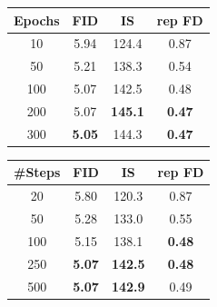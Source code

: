 \documentclass[10pt]{article}
\begin{document}
{\begin{minipage}[t]{.24\linewidth}\centering\fontsize{8}{9.1}\selectfont\begin{tabular}{cccc}
Epochs & FID & IS & rep FD \\
\midrule
10 & 5.94 & 124.4 & 0.87 \\
50 & 5.21 & 138.3 & 0.54 \\
100 & \cellcolor{grayband}5.07 & \cellcolor{grayband}142.5 & \cellcolor{grayband}0.48 \\
200 & 5.07 & \textbf{145.1} & \textbf{0.47} \\
300 & \textbf{5.05} & 144.3 & \textbf{0.47} \\
\end{tabular}\par{}\end{minipage}\hspace{1.5mm}%
\begin{minipage}[t]{.24\linewidth}\centering\fontsize{8}{9.1}\selectfont\begin{tabular}{cccc}
\#Steps & FID & IS & rep FD \\
\midrule
20 & 5.80 & 120.3 & 0.87 \\
50 & 5.28 & 133.0 & 0.55 \\
100 & 5.15 & 138.1 & \textbf{0.48} \\
250 & \cellcolor{grayband}\textbf{5.07} & \cellcolor{grayband}\textbf{142.5} & \cellcolor{grayband}\textbf{0.48} \\
500 & \textbf{5.07} & \textbf{142.9} & 0.49 \\
\end{tabular}\par{}\end{minipage}}
\end{document}
